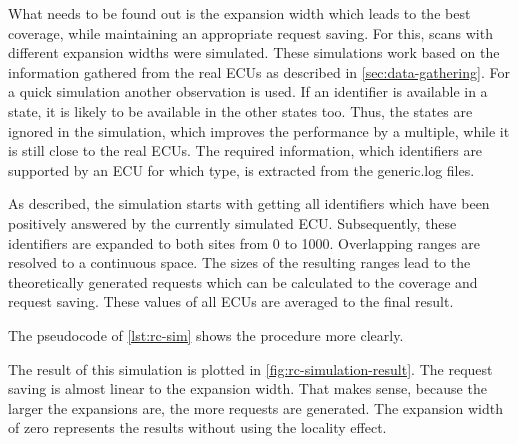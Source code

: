 What needs to be found out is the expansion width which leads to the best coverage, while maintaining an appropriate request saving. For this, scans with different expansion widths were simulated. These simulations work based on the information gathered from the real ECUs as described in \autoref{sec:data-gathering}. For a quick simulation another observation is used. If an identifier is available in a state, it is likely to be available in the other states too. Thus, the states are ignored in the simulation, which improves the performance by a multiple, while it is still close to the real ECUs. The required information, which identifiers are supported by an ECU for which type, is extracted from the generic.log files.

As described, the simulation starts with getting all identifiers which have been positively answered by the currently simulated ECU. Subsequently, these identifiers are expanded to both sites from 0 to 1000. Overlapping ranges are resolved to a continuous space. The sizes of the resulting ranges lead to the theoretically generated requests which can be calculated to the coverage and request saving. These values of all ECUs are averaged to the final result.
 
The pseudocode of \autoref{lst:rc-sim} shows the procedure more clearly.


The result of this simulation is plotted in \autoref{fig:rc-simulation-result}. The request saving is almost linear to the expansion width. That makes sense, because the larger the expansions are, the more requests are generated. The expansion width of zero represents the results without using the locality effect.

